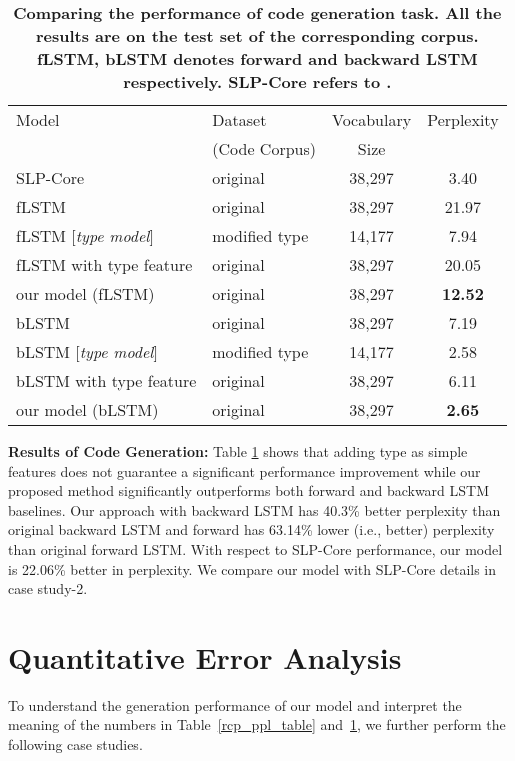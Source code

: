 \documentclass[11pt,a4paper]{article}
\begin{document}
\begin{table}
\scriptsize
\centering
 \begin{tabular}{l| l| c |  c} 
 \toprule
 Model & Dataset  & Vocabulary & Perplexity   \\ 
       & (Code Corpus)  & Size &    \\ 
       \midrule
       SLP-Core & original   & 38,297  & 3.40 \\
 \midrule
   fLSTM & original   & 38,297  & 21.97 \\
    fLSTM [\textit{type model}] & modified  type  & 14,177  & 7.94 \\
    fLSTM with type feature & original   & 38,297  & 20.05 \\
     our model (fLSTM)  & original  &  38,297 & \textbf{12.52} \\
   \midrule
 bLSTM & original  &  38,297 & 7.19 \\
 
 bLSTM [\textit{type model}] & modified  type  &  14,177 & 2.58 \\
 
 bLSTM with type feature & original  &  38,297 & 6.11 \\
 
  our model (bLSTM)  & original  &  38,297 & \textbf{2.65}  \\
 \bottomrule
 \end{tabular}
 \caption{\textbf{\small Comparing the performance of code generation task. All the results are on the test set of the corresponding corpus. fLSTM, bLSTM denotes forward and backward LSTM respectively. SLP-Core refers to \cite{deep_net_for_source_code}.}}
 \label{code_ppl_table}
\end{table} 

\textbf{Results of Code Generation:}
 Table \ref{code_ppl_table} shows that adding type as simple features does not guarantee a significant performance improvement while our proposed method significantly outperforms both forward and backward LSTM baselines. Our approach with backward LSTM has 40.3\% better perplexity than original backward LSTM and forward has  63.14\% lower (i.e., better) perplexity than original forward LSTM. With respect to SLP-Core performance, our model is 22.06\% better in perplexity. We compare our model with SLP-Core details in case study-2.










\section{Quantitative Error Analysis}
To understand the generation performance of our model and interpret the meaning of the numbers in Table~\ref{rcp_ppl_table} and~\ref{code_ppl_table}, we further perform the following case studies. 
\end{document}
